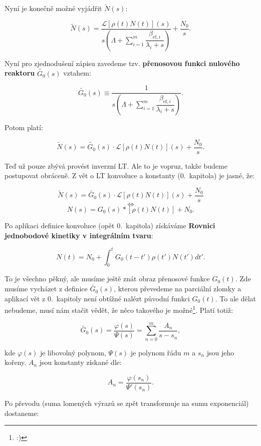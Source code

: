 Nyní je konečně možné vyjádřit $\tilde{N}(s)$:

$$ \tilde{N}(s) = \dfrac{\mathcal{L}[\rho(t) N(t)](s)}{s \left ( \Lambda + \sum_{i=1}^m \dfrac{\beta_{\text{ef},i}}{\lambda_i + s} \right )} + \dfrac{N_0}{s}. $$

Nyní pro zjednodušení zápisu zavedeme tzv. \textbf{přenosovou funkci nulového reaktoru} $\tilde{G_0}(s)$ vztahem:

\begin{equation}
  \boxed{
  \tilde{G_0}(s) \equiv \dfrac{1}{s \left ( \Lambda + \sum_{i=1}^m \dfrac{\beta_{\text{ef},i}}{\lambda_i + s} \right )}.
  \label{prenosova_funkce}
  }
\end{equation}

Potom platí:

$$ \tilde{N}(s) = \tilde{G_0}(s) \cdot \mathcal{L}[\rho(t) N(t)](s) + \dfrac{N_0}{s}. $$

Teď už pouze zbývá provést inverzní LT. Ale to je vopruz, takže budeme postupovat obráceně. Z vět o LT konvoluce a konstanty (0.~kapitola) je jasné, že:

$$ \tilde{N}(s) = \tilde{G_0}(s) \cdot \mathcal{L}[\rho(t) N(t)](s) + \dfrac{N_0}{s} $$
$$ \Leftrightarrow $$
$$ N(s) = G_0(s) * [\rho(t) N(t)] + N_0. $$

Po aplikaci definice konvoluce (opět 0.~kapitola) získáváme \textbf{Rovnici jednobodové kinetiky v integrálním tvaru}:

\begin{equation}
  \boxed{
  N(t) = N_0 + \int_0^t G_0(t-t') \rho(t') N(t')dt'.
  \label{integralni_kinetika}
  }
\end{equation}

To je všechno pěkný, ale musíme ještě znát obraz přenosové funkce $G_0(t)$. Zde musíme vycházet z definice $\tilde{G_0}(s)$, kterou převedeme na parciální zlomky a aplikací vět z 0.~kapitoly není obtížné nalézt původní funkci $G_0(t)$. To ale dělat nebudeme, musí nám stačit vědět, že něco takového je možné\footnote{:)}. Platí totiž:

$$ \tilde{G_0}(s) = \dfrac{\varphi(s)}{\Psi(s)} = \sum_{n=0}^m \dfrac{A_n}{s-s_n}, $$

kde $\varphi(s)$ je libovolný polynom, $\Psi(s)$ je polynom řádu $m$ a $s_n$ jsou jeho kořeny. $A_n$ jsou konstanty získané dle:

$$ A_n = \dfrac{\varphi(s_n)}{\Psi'(s_n)}. $$

Po převodu (suma lomených výrazů se zpět transformuje na sumu exponenciál) dostaneme:

